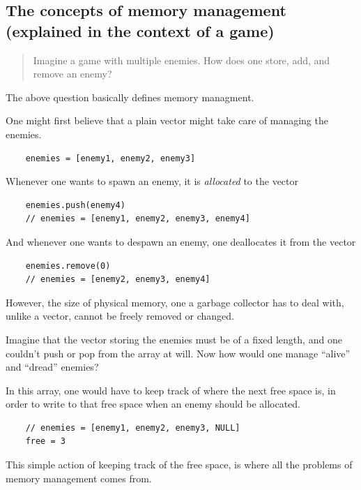 \documentclass[index]{subfiles}
\begin{document}
\subsection{The concepts of memory management (explained in the context of a game)}

\begin{quote}
    Imagine a game with multiple enemies. How does one store, add, and remove an enemy?
\end{quote}

The above question basically defines memory managment.

One might first believe that a plain vector might take care of managing the enemies.

\begin{verbatim}
    enemies = [enemy1, enemy2, enemy3]
\end{verbatim}

Whenever one wants to spawn an enemy, it is \textit{allocated} to the vector

\begin{verbatim}
    enemies.push(enemy4)
    // enemies = [enemy1, enemy2, enemy3, enemy4]
\end{verbatim}

And whenever one wants to despawn an enemy, one deallocates it from the vector

\begin{verbatim}
    enemies.remove(0)
    // enemies = [enemy2, enemy3, enemy4]
\end{verbatim}

However, the size of physical memory, one a garbage collector has to deal with, unlike a vector, cannot be freely removed or changed.

Imagine that the vector storing the enemies must be of a fixed length, and one couldn't push or pop from the array at will. Now how would one manage ``alive'' and ``dread'' enemies?

In this array, one would have to keep track of where the next free space is, in order to write to that free space when an enemy should be allocated.

\begin{verbatim}
    // enemies = [enemy1, enemy2, enemy3, NULL]
    free = 3
\end{verbatim}

This simple action of keeping track of the free space, is where all the problems of memory management comes from.
\end{document}
